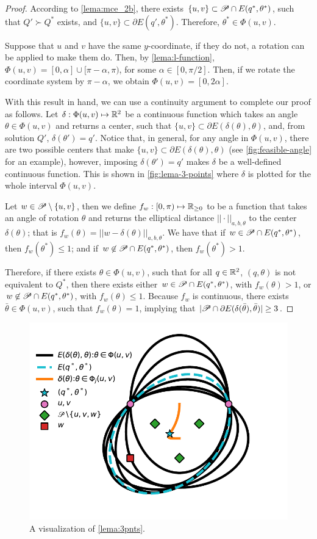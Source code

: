 \begin{proof}
	According to \autoref{lema:mce_2b}, there exists $\{u, v\} \subset \mathscr{P} \cap E(q^*, \theta^*)$, such that $Q' \succ Q^*$ exists, and $\{u, v\} \subset \partial E(q', \theta^*)$. Therefore, $\theta^*\in\Phi(u,v)$.
	
	Suppose that $u$ and $v$ have the same $y$-coordinate, if they do not, a rotation can be applied to make them do. Then, by \autoref{lema:l-function}, $\Phi(u,v)=[0, \alpha] \cup [\pi-\alpha, \pi)$, for some $\alpha \in [0, \pi/2]$. Then, if we rotate the coordinate system by $\pi-\alpha$, we obtain $\Phi(u,v)=[0, 2\alpha]$.
	
	With this result in hand, we can use a continuity argument to complete our proof as follows.
	Let $\delta : \Phi(u,v) \mapsto \mathbb{R}^2$ be a continuous function which takes an angle $\theta\in\Phi(u,v)$ and returns a center, such that $\{u,v\} \subset \partial E(\delta(\theta), \theta)$, and, from solution $Q'$, $\delta(\theta') = q'$. Notice that, in general, for any angle in $\Phi(u,v)$, there are two possible centers that make $\{u,v\} \subset \partial E(\delta(\theta), \theta)$ (see \autoref{fig:feasible-angle} for an example), however, imposing $\delta(\theta') = q'$ makes $\delta$ be a well-defined continuous function. This is shown in \autoref{fig:lema-3-points} where $\delta$ is plotted for the whole interval $\Phi(u,v)$.
	
	Let $w\in \mathscr{P} \setminus \{u,v\}$, then we define $f_w  : [0, \pi) \mapsto \mathbb{R}_{\ge0}$ to be a function that takes an angle of rotation $\theta$ and returns the elliptical distance $||\cdot||_{a,b,\theta}$ to the center $\delta(\theta)$; that is $f_w(\theta)=||w-\delta(\theta)||_{a,b,\theta}$.
	We have that if $w \in \mathscr{P} \cap E(q^*, \theta^*)$, then $f_w(\theta^*) \le 1$; and if $w \not\in \mathscr{P} \cap E(q^*, \theta^*)$, then $f_w(\theta^*) > 1$.
	
	Therefore, if there exists $\theta\in\Phi(u,v)$, such that for all $q\in\mathbb{R}^2$, $(q, \theta)$ is not equivalent to $Q^*$, then there exists either $w \in \mathscr{P} \cap E(q^*, \theta^*)$, with $f_w(\theta)>1$, or $w \not\in \mathscr{P} \cap E(q^*, \theta^*)$, with $f_w(\theta)\le 1$. Because $f_w$ is continuous, there exists $\bar{\theta}\in\Phi(u,v)$, such that $f_w(\theta)=1$, implying that $|\mathscr{P} \cap \partial E(\delta(\bar{\theta}), \bar{\theta})| \ge 3$.
\end{proof}

\begin{figure}[H]
	\centering
	\includegraphics[scale=.7]{figures/lema-3-points}
	\caption{A visualization of \autoref{lema:3pnts}.}
	\label{fig:lema-3-points}
\end{figure}